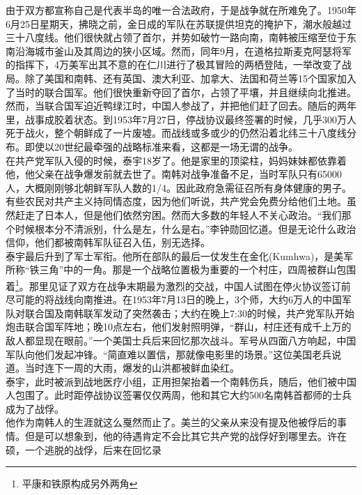 由于双方都宣称自己是代表半岛的唯一合法政府，于是战争就在所难免了。1950年6月25日星期天，拂晓之前，金日成的军队在苏联提供坦克的掩护下，潮水般越过三十八度线。他们很快就占领了首尔，并势如破竹一路向南，南韩被压缩至位于东南沿海城市釜山及其周边的狭小区域。然而，同年9月，在道格拉斯麦克阿瑟将军的指挥下，4万美军出其不意的在仁川进行了极其冒险的两栖登陆，一举改变了战局。除了美国和南韩、还有英国、澳大利亚、加拿大、法国和荷兰等15个国家加入了当时的联合国军。他们很快重新夺回了首尔，占领了平壤，并且继续向北推进。然而，当联合国军迫近鸭绿江时，中国人参战了，并把他们赶了回去。随后的两年里，战事成胶着状态。到1953年7月27日，停战协议最终签署的时候，几乎300万人死于战火，整个朝鲜成了一片废墟。而战线或多或少的仍然沿着北纬三十八度线分布。即使以20世纪最牵强的战略标准来看，这都是一场无谓的战争。\\

在共产党军队入侵的时候，泰宇18岁了。他是家里的顶梁柱，妈妈妹妹都依靠着他，他父亲在战争爆发前就去世了。南韩对战争准备不足，当时军队只有65000人，大概刚刚够北朝鲜军队人数的1/4。因此政府急需征召所有身体健康的男子。有些农民对共产主义持同情态度，因为他们听说，共产党会免费分给他们土地。虽然赶走了日本人，但是他们依然穷困。然而大多数的年轻人不关心政治。“我们那个时候根本分不清派别，什么是左，什么是右。”李钟勋回忆道。但是无论什么政治信仰，他们都被南韩军队征召入伍，别无选择。\\

泰宇最后升到了军士军衔。他所在部队的最后一仗发生在金化(Kumhwa)，是美军所称“铁三角”中的一角。那是一个战略位置极为重要的一个村庄，四周被群山包围着\footnote{平康和铁原构成另外两角}。那里见证了双方在战争末期最为激烈的交战，中国人试图在停火协议签订前尽可能的将战线向南推进。在1953年7月13日的晚上，3个师，大约6万人的中国军队对联合国及南韩联军发动了突然袭击；大约在晚上7:30的时候，共产党军队开始炮击联合国军阵地；晚10点左右，他们发射照明弹，“群山，村庄还有成千上万的敌人都显现在眼前。”一个美国士兵后来回忆那次战斗。军号从四面八方响起，中国军队向他们发起冲锋。“简直难以置信，那就像电影里的场景。”这位美国老兵说道。当时连下一周的大雨，爆发的山洪都被鲜血染红。\\

泰宇，此时被派到战地医疗小组，正用担架抬着一个南韩伤兵，随后，他们被中国人包围了。此时距停战协议签署仅仅两周，他和其它大约500名南韩首都师的士兵成为了战俘。\\

他作为南韩人的生涯就这么戛然而止了。美兰的父亲从来没有提及他被俘后的事情。但是可以想象到，他的待遇肯定不会比其它共产党的战俘好到哪里去。许在硕，一个逃脱的战俘，后来在回忆录\\

